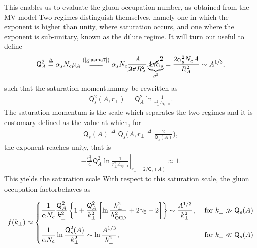 This enables us to evaluate the gluon occupation number, as obtained from the {\sffamily MV} model
Two regimes distinguish themselves, namely one in which the exponent is higher than unity, where saturation occurs, and one where the exponent is sub-unitary, known as the dilute regime. It will turn out useful to define 
\begin{align*}
    \textsf{Q}_A^2\overset{\Delta}{=}\alpha_sN_c\mu_A\stackrel{(\text{\cref{glasma7}})}{=\joinrel=\joinrel=}\alpha_sN_c\frac{A}{\cancel{2\pi} R_A^2}\underbrace{\cancelto{2}{4\pi}\alpha_s}_{g^2}=\frac{2\alpha_s^2N_cA}{R_A^2}\sim A^{1/3},
\end{align*}
such that the saturation momentummay be rewritten as
\begin{align*}
    \textsf{Q}_s^2(A,r_\perp)=\textsf{Q}_A^2\ln{\frac{1}{r_\perp^2\Lambda_{\textsf{QCD}}}}.
\end{align*}
The {\sffamily\color{ming} saturation momentum} is the scale which separates the two regimes and it is customary defined as the value at which, for 
\begin{align*}
    \textsf{Q}_s(A)\overset{\Delta}{=}\textsf{Q}_s\Big(A,r_\perp\overset{\Delta}{=}\frac{2}{\textsf{Q}_s(A)}\Big),
\end{align*}
the exponent reaches unity, that is
\begin{align*}
    \left.-\frac{r_\perp^2}{4}\textsf{Q}_A^2\ln{\frac{1}{r_\perp^2\Lambda_{\textsf{QCD}}}}\right|_{r_\perp=2/\textsf{Q}_s(A)}\approx 1.
\end{align*}
This yields the saturation scale
With respect to this saturation scale, the gluon occupation factorbehaves as
\begin{fullwidth}
\begin{align*}
    f(k_\perp)\approx\begin{cases}
    \dfrac{1}{\alpha N_{c}} \dfrac{\textsf{Q}_{A}^{2}}{k_{\perp}^{2}}\left\{1+\dfrac{\textsf{Q}_{A}^{2}}{k_{\perp}^{2}}\left[\ln \dfrac{k_{\perp}^{2}}{\Lambda_{\textsf{OCD}}^{2}}+2 \gamma_{\textsf{E}}-2\right]\right\}\sim \dfrac{A^{1/3}}{k_\perp^2}, &\text { for }k_{\perp} \gg \textsf{Q}_{s}(A)\\
    \vspace*{-5pt} \\
    \dfrac{1}{\alpha N_{c}} \ln \dfrac{\textsf{Q}_{s}^{2}(A)}{k_{\perp}^{2}}\sim\ln{\dfrac{A^{1/3}}{k_\perp^2}}, &\text { for }k_{\perp} \ll \textsf{Q}_{s}(A)
    \end{cases}
\end{align*}
\end{fullwidth}
